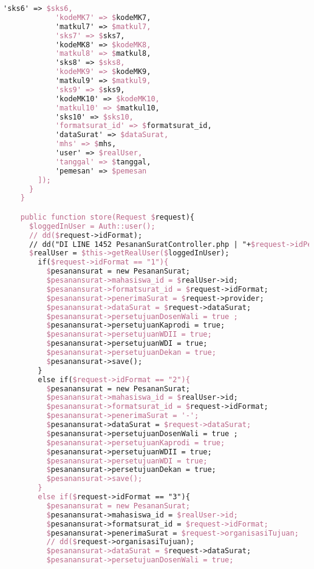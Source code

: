 \begin{lstlisting}[language=tex,basicstyle=\tiny,caption=PesanansuratController.php]
            'sks6' => $sks6,
            'kodeMK7' => $kodeMK7,
            'matkul7' => $matkul7,
            'sks7' => $sks7,
            'kodeMK8' => $kodeMK8,
            'matkul8' => $matkul8,
            'sks8' => $sks8,
            'kodeMK9' => $kodeMK9,
            'matkul9' => $matkul9,
            'sks9' => $sks9,
            'kodeMK10' => $kodeMK10,
            'matkul10' => $matkul10,
            'sks10' => $sks10,
            'formatsurat_id' => $formatsurat_id,
            'dataSurat' => $dataSurat,
            'mhs' => $mhs,
            'user' => $realUser,
            'tanggal' => $tanggal,
            'pemesan' => $pemesan
        ]);
      }
    }

    public function store(Request $request){
      $loggedInUser = Auth::user();
      // dd($request->idFormat);
      // dd("DI LINE 1452 PesananSuratController.php | "+$request->idPesanansurat);
      $realUser = $this->getRealUser($loggedInUser);
        if($request->idFormat == "1"){
          $pesanansurat = new PesananSurat;
          $pesanansurat->mahasiswa_id = $realUser->id;
          $pesanansurat->formatsurat_id = $request->idFormat;
          $pesanansurat->penerimaSurat = $request->provider;
          $pesanansurat->dataSurat = $request->dataSurat;
          $pesanansurat->persetujuanDosenWali = true ;
          $pesanansurat->persetujuanKaprodi = true;
          $pesanansurat->persetujuanWDII = true;
          $pesanansurat->persetujuanWDI = true;
          $pesanansurat->persetujuanDekan = true;
          $pesanansurat->save();
        }
        else if($request->idFormat == "2"){
          $pesanansurat = new PesananSurat;
          $pesanansurat->mahasiswa_id = $realUser->id;
          $pesanansurat->formatsurat_id = $request->idFormat;
          $pesanansurat->penerimaSurat = '-';
          $pesanansurat->dataSurat = $request->dataSurat;
          $pesanansurat->persetujuanDosenWali = true ;
          $pesanansurat->persetujuanKaprodi = true;
          $pesanansurat->persetujuanWDII = true;
          $pesanansurat->persetujuanWDI = true;
          $pesanansurat->persetujuanDekan = true;
          $pesanansurat->save();
        }
        else if($request->idFormat == "3"){
          $pesanansurat = new PesananSurat;
          $pesanansurat->mahasiswa_id = $realUser->id;
          $pesanansurat->formatsurat_id = $request->idFormat;
          $pesanansurat->penerimaSurat = $request->organisasiTujuan;
          // dd($request->organisasiTujuan);
          $pesanansurat->dataSurat = $request->dataSurat;
          $pesanansurat->persetujuanDosenWali = true;

\end{lstlisting}
